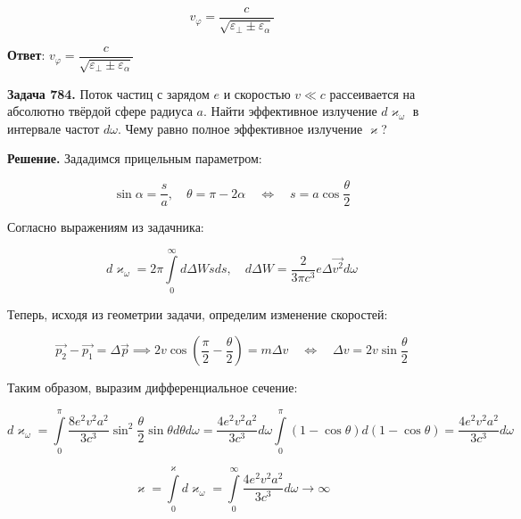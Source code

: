 \documentclass[a4paper,12pt]{article}
\begin{document}
	\begin{equation}
		v_\varphi = \dfrac{c}{\sqrt{\varepsilon_\perp \pm \varepsilon_\alpha}}
	\end{equation}
	
	\quad \textbf{Ответ}: $v_\varphi = \dfrac{c}{\sqrt{\varepsilon_\perp \pm \varepsilon_\alpha}}$ 
	
	\quad \textbf{Задача 784.} Поток частиц с зарядом $e$ и скоростью $v \ll c$ рассеивается на абсолютно твёрдой сфере радиуса $a$. Найти эффективное излучение $d\varkappa_\omega$ в интервале частот $d\omega$. Чему равно полное эффективное излучение $\varkappa$?
	
	\quad \textbf{Решение.} Зададимся прицельным параметром:
	
	\begin{equation}
		\sin\alpha = \dfrac{s}{a}, \quad \theta = \pi - 2\alpha \quad \Leftrightarrow \quad s = a\cos\dfrac{\theta}{2}
	\end{equation}
	
	\quad Согласно выражениям из задачника: 
	
	\begin{equation}
		d\varkappa_\omega = 2\pi \displaystyle\int\limits_{0}^{\infty} d\Delta W sds, \quad d\Delta W = \dfrac{2}{3\pi c^3} e\Delta\vec{v^2} d\omega
	\end{equation}
	
	\quad Теперь, исходя из геометрии задачи, определим изменение скоростей:
	
	\begin{equation}
		\vec{p_2} - \vec{p_1} = \Delta \vec{p} \implies 2v\cos\left( \dfrac{\pi}{2} -  \dfrac{\theta}{2}\right) = m\Delta v \quad \Leftrightarrow \quad \Delta v = 2v\sin\dfrac{\theta}{2}
	\end{equation}
	
	\quad Таким образом, выразим дифференциальное сечение: 
	
	\begin{equation}
		d\varkappa_\omega =\displaystyle\int\limits_{0}^{\pi} \dfrac{8e^2v^2 a^2}{3 c^3}\sin^2 \dfrac{\theta}{2} \sin\theta d\theta d\omega =  \dfrac{4e^2v^2 a^2}{3 c^3} d\omega \displaystyle\int\limits_{0}^{\pi}  \left(1-\cos\theta\right) d\left(1 - \cos\theta\right) = \dfrac{4e^2v^2 a^2}{3c^3}d\omega
	\end{equation} 
	
	\begin{equation}
		\varkappa = \displaystyle\int\limits_{0}^{\varkappa} d\varkappa_\omega = \displaystyle\int\limits_{0}^{\infty} \dfrac{4e^2v^2 a^2}{3c^3}d\omega \to \infty
	\end{equation}
	
\end{document}
